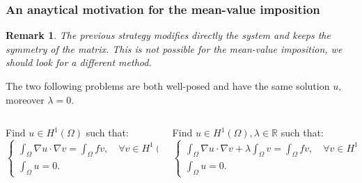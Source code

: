 \documentclass[8pt]{beamer}
\newtheorem*{remark}{Remark}
\begin{document}
\begin{frame}
\frametitle{An anaytical motivation for the mean-value imposition}
\begin{remark}
The previous strategy modifies directly the system and keeps the symmetry of the matrix. This is not possible for the mean-value imposition, we should look for a different method.
\end{remark}
\vspace{2mm}
\begin{lemma}
	The two following problems are both well-posed and have the same solution $u$, moreover $\lambda=0$.
\end{lemma}
\vspace{2mm}

\begin{columns}
	\begin{column}{0.45\textwidth}
		Find $u\in H^1(\Omega)$ such that:
		\begin{equation*}
		\begin{cases}
		\int_{\Omega}\nabla u \cdot \nabla v = \int_{\Omega} fv, \quad \forall v \in H^1(\Omega),\\[2ex]
		\int_{\Omega}u = 0.
		\end{cases}
		\end{equation*}
	\end{column}
	\begin{column}{0.55\textwidth}  
		Find $ u \in H^1(\Omega), \lambda \in \mathbb{R}$ such that:
		\begin{equation*}
		\begin{cases}
	     \int_{\Omega}\nabla u \cdot \nabla v + \lambda \int_\Omega v = \int_{\Omega} fv, \quad \forall v \in H^1(\Omega), \\[2ex]
		\int_{\Omega}u= 0.
		\end{cases}
		\end{equation*}
	\end{column}
\end{columns}
\end{frame}
\end{document}
